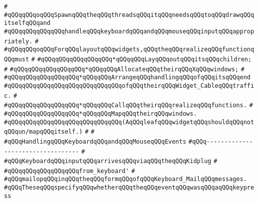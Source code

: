 \verb|#|\newline
\verb|#qQQqqQQqoqQQqSpawnqQQqtheqQQqthreadsqQQqitqQQqneedsqQQqtoqQQqdrawqQQqitselfqQQqand|\newline
\verb|#qQQqqQQqqQQqqQQqhandleqQQqkeyboardqQQqandqQQqmouseqQQqinputqQQqappropriately.|\newline
\verb|#|\newline
\verb|#qQQqqQQqoqQQqForqQQqlayoutqQQqwidgets,qQQqtheqQQqrealizeqQQqfunctionqQQqmust|\newline
\verb|#|\newline
\verb|#qQQqqQQqqQQqqQQqqQQq*qQQqqQQqLayqQQqoutqQQqitsqQQqchildren;|\newline
\verb|#|\newline
\verb|#qQQqqQQqqQQqqQQqqQQq*qQQqqQQqAllocateqQQqtheirqQQqXqQQqwindows;|\newline
\verb|#|\newline
\verb|#qQQqqQQqqQQqqQQqqQQq*qQQqqQQqArrangeqQQqhandlingqQQqofqQQqitsqQQqend|\newline
\verb|#qQQqqQQqqQQqqQQqqQQqqQQqqQQqqQQqofqQQqtheirqQQqWidget_CableqQQqtraffic.|\newline
\verb|#|\newline
\verb|#qQQqqQQqqQQqqQQqqQQq*qQQqqQQqCallqQQqtheirqQQqrealizeqQQqfunctions.|\newline
\verb|#|\newline
\verb|#qQQqqQQqqQQqqQQqqQQq*qQQqqQQqMapqQQqtheirqQQqwindows.|\newline
\verb|#qQQqqQQqqQQqqQQqqQQqqQQqqQQqqQQq(AqQQqleafqQQqwidgetqQQqshouldqQQqnotqQQqun/mapqQQqitself.)|\newline
\verb|#|\newline
\verb|#|\newline
\verb|#qQQqHandlingqQQqKeyboardqQQqandqQQqMouseqQQqEvents|\newline
\verb|#qQQq----------------------------------|\newline
\verb|#|\newline
\verb|#qQQqKeyboardqQQqinputqQQqarrivesqQQqviaqQQqtheqQQqKidplug|\newline
\verb|#|\newline
\verb|#qQQqqQQqqQQqqQQqqQQqfrom_keyboard'|\newline
\verb|#|\newline
\verb|#qQQqmailopqQQqinqQQqtheqQQqformqQQqofqQQqKeyboard_MailqQQqmessages.|\newline
\verb|#qQQqTheseqQQqspecifyqQQqwhetherqQQqtheqQQqeventqQQqwasqQQqaqQQqkeypress|\newline
